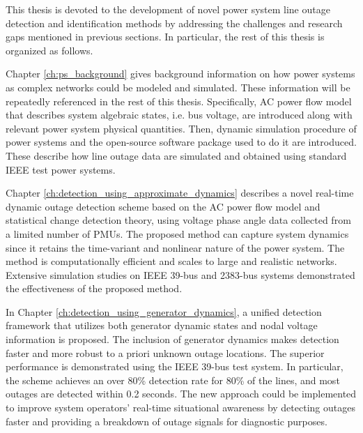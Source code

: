This thesis is devoted to the development of novel power system line outage detection and identification methods by addressing the challenges and research gaps mentioned in previous sections. In particular, the rest of this thesis is organized as follows.

Chapter \ref{ch:ps_background} gives background information on how power systems as complex networks could be modeled and simulated. These information will be repeatedly referenced in the rest of this thesis. Specifically, AC power flow model that describes system algebraic states, i.e. bus voltage, are introduced along with relevant power system physical quantities. Then, dynamic simulation procedure of power systems and the open-source software package used to do it are introduced. These describe how line outage data are simulated and obtained using standard IEEE test power systems. 

Chapter \ref{ch:detection_using_approximate_dynamics} describes a novel real-time dynamic outage detection scheme based on the AC power flow model and statistical change detection theory, using voltage phase angle data collected from a limited number of PMUs. The proposed method can capture system dynamics since it retains the time-variant and nonlinear nature of the power system. The method is computationally efficient and scales to large and realistic networks. Extensive simulation studies on IEEE 39-bus and 2383-bus systems demonstrated the effectiveness of the proposed method.

In Chapter \ref{ch:detection_using_generator_dynamics}, a unified detection framework that utilizes both generator dynamic states and nodal voltage information is proposed. The inclusion of generator dynamics makes detection faster and more robust to a priori unknown outage locations. The superior performance is demonstrated using the IEEE 39-bus test system. In particular, the scheme achieves an over 80\% detection rate for 80\% of the lines, and most outages are detected within 0.2 seconds. 
The new approach could be implemented to improve system operators' real-time situational awareness by detecting outages faster and providing a breakdown of outage signals for diagnostic purposes.

